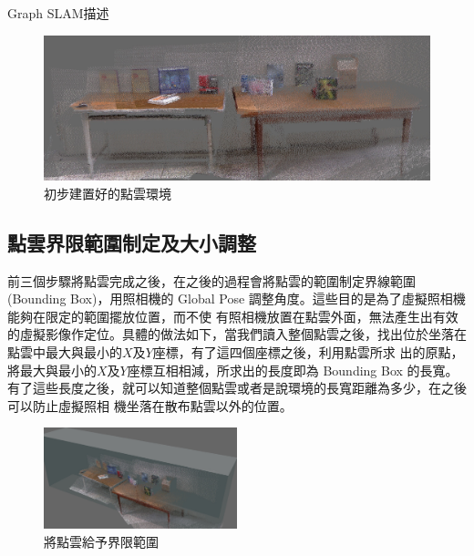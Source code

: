     Graph SLAM描述     
          

\begin{figure}
  \includegraphics[width=\textwidth]{figures/3DPoint_Cloud_Map.jpg}
  \caption{初步建置好的點雲環境}
  \label{fig:Point Cloud Map}
\end{figure}


\subsection{點雲界限範圍制定及大小調整}
     
%     
    前三個步驟將點雲完成之後，在之後的過程會將點雲的範圍制定界線範圍(Bounding Box)，用照相機的 Global Pose 調整角度。這些目的是為了虛擬照相機能夠在限定的範圍擺放位置，而不使
    有照相機放置在點雲外面，無法產生出有效的虛擬影像作定位。具體的做法如下，當我們讀入整個點雲之後，找出位於坐落在點雲中最大與最小的$X$及$Y$座標，有了這四個座標之後，利用點雲所求
    出的原點，將最大與最小的$X$及$Y$座標互相相減，所求出的長度即為 Bounding Box 的長寬。有了這些長度之後，就可以知道整個點雲或者是說環境的長寬距離為多少，在之後可以防止虛擬照相
    機坐落在散布點雲以外的位置。


\begin{figure}
\begin{center}
  \includegraphics[width=0.5\textwidth]{figures/Bounding_Box.jpg}
  \caption{將點雲給予界限範圍}
  \label{fig:Bounding Box}
\end{center}
\end{figure}   
    

